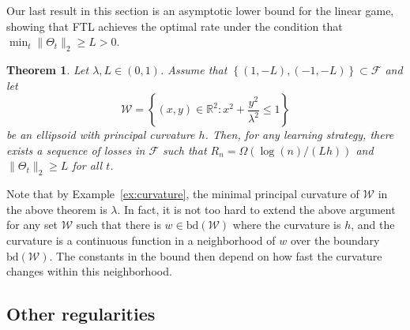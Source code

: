 \documentclass[english]{article}
\newcommand{\todoc}[2][]{\todo[color=Apricot!20,size=\tiny,#1]{C: #2}}
\newcommand{\cW}{\mathcal{W}}
\newcommand{\cF}{\mathcal{F}}
\newcommand{\seto}[1]{\left\{#1\right\}}
\newcommand{\R}{\mathbb{R}}
\newcommand{\bd}{\mathrm{bd}}
\newtheorem{thm}{Theorem}[section]
\newtheorem{prop}[thm]{Proposition}
\begin{document}

Our last result in this section is an asymptotic lower bound for the linear game, showing that FTL achieves the optimal rate under the condition that  $\min_t \|\Theta_t\|_2\ge L >0$.
\begin{thm}
	\label{thm:lowerbound}
		Let $\lambda,L \in (0,1)$. Assume that  $\seto{(1,-L), (-1, -L)} \subset \cF$ and let \[
		\cW = \seto{(x,y) \in \R^2: x^2 + \frac{y^2}{\lambda^2} \le 1}
		\]
		be
		an ellipsoid with principal curvature $h$.
 		Then, for any learning strategy, there exists a sequence of losses in $\mathcal F$ such that $R_n = \Omega\left(\log(n)/(Lh)\right)$ and $\|\Theta_t\|_2 \ge L$ for all $t$.
\end{thm}

Note that by Example~\ref{ex:curvature}, the minimal principal curvature of $\cW$ in the above theorem is $\lambda$. In fact, it is not too hard to extend the above argument for any set $\cW$ such that there is $w \in \bd(\cW)$ where the curvature is $h$, and the curvature is a continuous function in a neighborhood of $w$ over the boundary $\bd(\cW)$. The constants in the bound then depend on how fast the curvature changes within this neighborhood.



\subsection{Other regularities}
\end{document}
